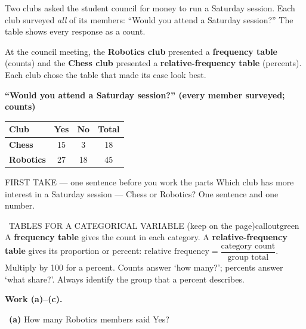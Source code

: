 \documentclass[11pt]{article}
\begin{document}


Two clubs asked the student council for money to run a Saturday session. Each club surveyed \emph{all} of its members: ``Would you attend a Saturday session?'' The table shows every response as a count.\par\smallskip At the council meeting, the \textbf{Robotics club} presented a \textbf{frequency table} (counts) and the \textbf{Chess club} presented a \textbf{relative-frequency table} (percents). Each club chose the table that made its case look best.\par
\begin{center}
\textbf{``Would you attend a Saturday session?'' (every member surveyed; counts)}\par\smallskip
\begin{tabular}{|l|c|c|c|}
\hline
\textbf{Club} & \textbf{Yes} & \textbf{No} & \textbf{Total} \\ \hline
\textbf{Chess} & 15 & 3 & 18 \\ \hline
\textbf{Robotics} & 27 & 18 & 45 \\ \hline
\end{tabular}
\end{center}
\begin{firsttakebox}{FIRST TAKE --- one sentence before you work the parts}
Which club has more interest in a Saturday session --- Chess or Robotics? One sentence and one number.
\workspace{0.9in}
\end{firsttakebox}

\begin{callout}{\IconBook\ TABLES FOR A CATEGORICAL VARIABLE (keep on the page)}{calloutgreen}
A \textbf{frequency table} gives the count in each category. A \textbf{relative-frequency table} gives its proportion or percent: $\text{relative frequency}=\dfrac{\text{category count}}{\text{group total}}$. Multiply by 100 for a percent. Counts answer `how many?'; percents answer `what share?'. Always identify the group that a percent describes.
\end{callout}

\newpage
\textbf{Work (a)--(c).}\par\smallskip

~\textbf{(a)} How many Robotics members said Yes?\par
\workspace{0.8in}
\end{document}
